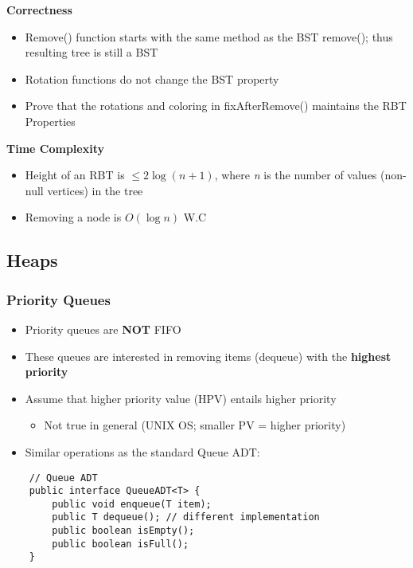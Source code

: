 \documentclass[10pt, 
a4paper, 
oneside, 
headinclude, footinclude, 
BCOR5mm]
{scrartcl}
\begin{document}
\textbf{Correctness}
\begin{itemize}
    \item Remove() function starts with the same method as the BST remove(); thus resulting tree is still a BST
    \item Rotation functions do not change the BST property
    \item Prove that the rotations and coloring in fixAfterRemove() maintains the RBT Properties
\end{itemize}
\textbf{Time Complexity}
\begin{itemize}
    \item Height of an RBT is $\leq 2\log(n+1)$, where \textit{n} is the number of values (non-null vertices) in the tree
    \item Removing a node is $O(\log n)$ W.C
\end{itemize}
\newpage
\subsection{Heaps}
\subsubsection{Priority Queues} \label{subsubsec:prio-q}
\begin{itemize}
    \item Priority queues are \textbf{NOT} FIFO
    \item These queues are interested in removing items (dequeue) with the \textbf{highest priority}
    \item Assume that higher priority value (HPV) entails higher priority
    \begin{itemize}
        \item Not true in general (UNIX OS; smaller PV = higher priority)
    \end{itemize}
    \item Similar operations as the standard Queue ADT:
\end{itemize}
\begin{lstlisting}
    // Queue ADT
    public interface QueueADT<T> {
        public void enqueue(T item);
        public T dequeue(); // different implementation
        public boolean isEmpty();
        public boolean isFull();
    }
\end{lstlisting}
\BlankLine
\end{document}
